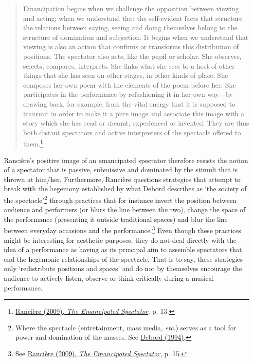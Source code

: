 \begin{quote}
Emancipation begins when we challenge the opposition between viewing and acting; when we understand that the self-evident facts that structure the relations between saying, seeing and doing themselves belong to the structure of domination and subjection. It begins when we understand that viewing is also an action that confirms or transforms this distribution of positions. The spectator also acts, like the pupil or scholar. She observes, selects, compares, interprets. She links what she sees to a host of other things that she has seen on other stages, in other kinds of place. She composes her own poem with the elements of the poem before her. She participates in the performance by refashioning it in her own way---by drawing back, for example, from the vital energy that it is supposed to transmit in order to make it a pure image and associate this image with a story which she has read or dreamt, experienced or invented. They are thus both distant spectators and active interpreters of the spectacle offered to them.\footnote{\hyperlink{ranspec}{Ranci\`{e}re (2009), \emph{The Emancipated Spectator}}, p. 13.}
\end{quote}

Ranci\`{e}re's positive image of an emancipated spectator therefore resists the notion of a spectator that is passive, submissive and dominated by the stimuli that is thrown at him/her. Furthermore, Ranci\`{e}re questions strategies that attempt to break with the hegemony established by what Debord describes as `the society of the spectacle'\footnote{Where the spectacle (entretainment, mass media, \emph{etc}.) serves as a tool for power and domination of the masses. See \hyperlink{debord}{Debord (1994)}.} through practices that for instance invert the position between audience and performers (or blurs the line between the two), change the space of the performance (presenting it outside traditional spaces) and blur the line between everyday occasions and the performance.\footnote{See \hyperlink{ranspec}{Ranci\`{e}re (2009), \emph{The Emancipated Spectator}}, p. 15.} Even though these practices might be interesting for aesthetic purposes, they do not deal directly with the idea of a performance as having as its principal aim to assemble spectators that end the hegemonic relationships of the spectacle. That is to say, these strategies only `redistribute positions and spaces' and do not by themselves encourage the audience to actively listen, observe or think critically during a musical performance. 

